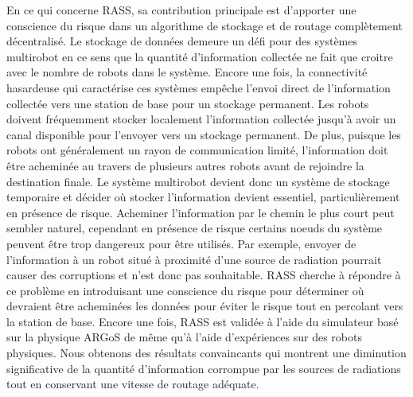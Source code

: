 En ce qui concerne RASS, sa contribution principale est d'apporter une conscience du risque dans un algorithme de stockage et de routage complètement décentralisé. Le stockage de données demeure un défi pour des systèmes multirobot en ce sens que la quantité d'information collectée ne fait que croitre avec le nombre de robots dans le système. Encore une fois, la connectivité hasardeuse qui caractérise ces systèmes empêche l'envoi direct de l'information collectée vers une station de base pour un stockage permanent. Les robots doivent fréquemment stocker localement l'information collectée jusqu'à avoir un canal disponible pour l'envoyer vers un stockage permanent. De plus, puisque les robots ont généralement un rayon de communication limité, l'information doit être acheminée au travers de plusieurs autres robots avant de rejoindre la destination finale. Le système multirobot devient donc un système de stockage temporaire et décider où stocker l'information devient essentiel, particulièrement en présence de risque. Acheminer l'information par le chemin le plus court peut sembler naturel, cependant en présence de risque certains noeuds du système peuvent être trop dangereux pour être utilisés. Par exemple, envoyer de l'information à un robot situé à proximité d'une source de radiation pourrait causer des corruptions et n'est donc pas souhaitable. RASS cherche à répondre à ce problème en introduisant une conscience du risque pour déterminer où devraient être acheminées les données pour éviter le risque tout en percolant vers la station de base. Encore une fois, RASS est validée à l'aide du simulateur basé sur la physique ARGoS de même qu'à l'aide d'expériences sur des robots physiques. Nous obtenons des résultats convaincants qui montrent une diminution significative de la quantité d'information corrompue par les sources de radiations tout en conservant une vitesse de routage adéquate.


